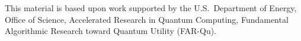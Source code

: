 \documentclass[
    reprint,
    amsmath,amssymb,
    aps,
    pra,  %
    superscriptaddress,
    floatfix
]{revtex4-2}
\theoremstyle{aps}
\begin{document}
\maketitle















\begin{acknowledgments}
	This material is based upon work supported by the U.S.\
	Department of Energy, Office of Science, Accelerated Research
	in Quantum Computing, Fundamental Algorithmic Research toward
	Quantum Utility (FAR-Qu).
\end{acknowledgments}




\end{document}
